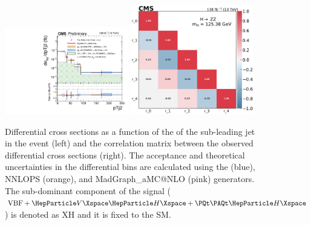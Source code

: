 \begin{center}
	\begin{figure}[!htb]
		\centering
		\includegraphics[width=0.48\textwidth]{Images/H4L/pTj2_unfoldwith_SM_125_logscale_asimov.pdf}	\includegraphics[width=0.48\textwidth]{Images/H4L/correlations/corr_pTj2_v3.pdf}\\
		\caption{
			Differential cross sections as a function of the \pt of the sub-leading jet in the event (left) and the correlation matrix between the observed differential cross sections (right).
			The acceptance and theoretical uncertainties in the differential bins are calculated using the \POWHEG (blue), NNLOPS (orange), and MadGraph\_aMC@NLO (pink) generators.
			The sub-dominant component of the signal ($\VBF + \VH + \ttH$) is denoted as XH and it is fixed to the SM.
			\label{fig:fidPTJ2}}
	\end{figure}
\end{center}

\clearpage


